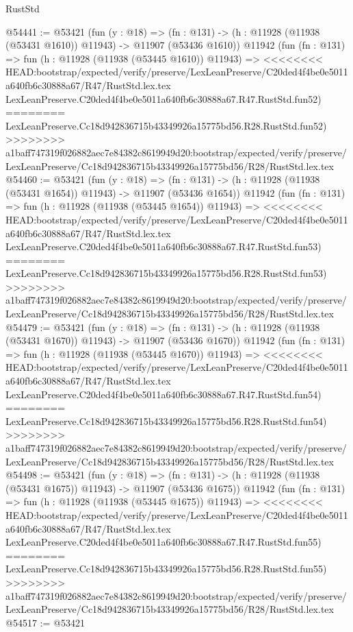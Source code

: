 \begin{lexlean}{RustStd}
\begin{coremodule}
{\begin{coremodule}
{{{{{{{{{{{{{{{{{{{{{{{{{{{{{{{{{{{{{{{{{{{{{{{{{{{{{{{{{{{{{{{{{{{{{{{{{{{{{{{{@54441 := @53421
    (fun (y : @18) =>
    (fn : @131) -> (h : @11928 (@11938 (@53431 @1610)) @11943) -> @11907 (@53436 @1610))
    @11942
    (fun (fn : @131) =>
    fun (h : @11928 (@11938 (@53445 @1610)) @11943) =>
<<<<<<<< HEAD:bootstrap/expected/verify/preserve/LexLeanPreserve/C20ded4f4be0e5011a640fb6c30888a67/R47/RustStd.lex.tex
    LexLeanPreserve.C20ded4f4be0e5011a640fb6c30888a67.R47.RustStd.fun52)
========
    LexLeanPreserve.Cc18d942836715b43349926a15775bd56.R28.RustStd.fun52)
>>>>>>>> a1baff747319f026882aec7e84382c8619949d20:bootstrap/expected/verify/preserve/LexLeanPreserve/Cc18d942836715b43349926a15775bd56/R28/RustStd.lex.tex
@54460 := @53421
    (fun (y : @18) =>
    (fn : @131) -> (h : @11928 (@11938 (@53431 @1654)) @11943) -> @11907 (@53436 @1654))
    @11942
    (fun (fn : @131) =>
    fun (h : @11928 (@11938 (@53445 @1654)) @11943) =>
<<<<<<<< HEAD:bootstrap/expected/verify/preserve/LexLeanPreserve/C20ded4f4be0e5011a640fb6c30888a67/R47/RustStd.lex.tex
    LexLeanPreserve.C20ded4f4be0e5011a640fb6c30888a67.R47.RustStd.fun53)
========
    LexLeanPreserve.Cc18d942836715b43349926a15775bd56.R28.RustStd.fun53)
>>>>>>>> a1baff747319f026882aec7e84382c8619949d20:bootstrap/expected/verify/preserve/LexLeanPreserve/Cc18d942836715b43349926a15775bd56/R28/RustStd.lex.tex
@54479 := @53421
    (fun (y : @18) =>
    (fn : @131) -> (h : @11928 (@11938 (@53431 @1670)) @11943) -> @11907 (@53436 @1670))
    @11942
    (fun (fn : @131) =>
    fun (h : @11928 (@11938 (@53445 @1670)) @11943) =>
<<<<<<<< HEAD:bootstrap/expected/verify/preserve/LexLeanPreserve/C20ded4f4be0e5011a640fb6c30888a67/R47/RustStd.lex.tex
    LexLeanPreserve.C20ded4f4be0e5011a640fb6c30888a67.R47.RustStd.fun54)
========
    LexLeanPreserve.Cc18d942836715b43349926a15775bd56.R28.RustStd.fun54)
>>>>>>>> a1baff747319f026882aec7e84382c8619949d20:bootstrap/expected/verify/preserve/LexLeanPreserve/Cc18d942836715b43349926a15775bd56/R28/RustStd.lex.tex
@54498 := @53421
    (fun (y : @18) =>
    (fn : @131) -> (h : @11928 (@11938 (@53431 @1675)) @11943) -> @11907 (@53436 @1675))
    @11942
    (fun (fn : @131) =>
    fun (h : @11928 (@11938 (@53445 @1675)) @11943) =>
<<<<<<<< HEAD:bootstrap/expected/verify/preserve/LexLeanPreserve/C20ded4f4be0e5011a640fb6c30888a67/R47/RustStd.lex.tex
    LexLeanPreserve.C20ded4f4be0e5011a640fb6c30888a67.R47.RustStd.fun55)
========
    LexLeanPreserve.Cc18d942836715b43349926a15775bd56.R28.RustStd.fun55)
>>>>>>>> a1baff747319f026882aec7e84382c8619949d20:bootstrap/expected/verify/preserve/LexLeanPreserve/Cc18d942836715b43349926a15775bd56/R28/RustStd.lex.tex
@54517 := @53421
}}}}}}}}}}}}}}}}}}}}}}}}}}}}}}}}}}}}}}}}}}}}}}}}}}}}}}}}}}}}}}}}}}}}}}}}}}}}}}}}
\end{coremodule}}
\end{coremodule}
\end{lexlean}
